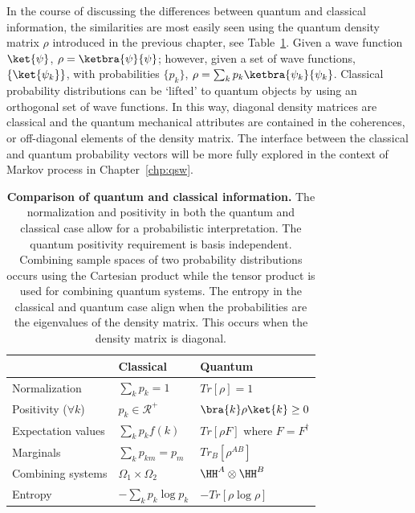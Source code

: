 \documentclass[11pt,oneside,final]{huthesis}%
\begin{document}
In the course of discussing the differences between quantum and classical information, the similarities are most easily seen using the quantum density matrix $\rho$ introduced in the previous chapter, see Table~\ref{tab:qcl}.  Given a wave function $\ket{\psi}$, $\rho=\ketbra{\psi}{\psi}$; however, given a set of wave functions, $\{\ket{\psi_k}\}$, with probabilities $\{p_k\}$, $\rho=\sum_k p_k \ketbra{\psi_k}{\psi_k}$.
Classical probability distributions can be `lifted' to quantum objects by using an orthogonal set of wave functions.  In this way, diagonal density matrices are classical and the quantum mechanical attributes are contained in the coherences, or off-diagonal elements of the density matrix. The interface between the classical and quantum probability vectors will be more fully explored in the context of Markov process in Chapter~\ref{chp:qsw}. %
\begin{table}
	\centering
	\begin{tabular}{lll}
	\hline
	      &Classical       &    Quantum\\[2ex]
	      \hline
Normalization &$\sum_k p_k=1$  & $Tr[\rho]=1$\\[2ex] %
Positivity ($\forall k$) &$p_k\in \mathcal{R}^+$&$\bra{k}\rho\ket{k}\geq 0$\\[2ex]
Expectation values & $\sum_k p_k f(k) $  & $Tr[\rho F]$ where $F=F^\dagger$\\[2ex] %
Marginals & $\sum_k p_{km}=p_m$& $Tr_B[\rho^{AB}]$ \\[2ex]
Combining systems & $\Omega_1\times\Omega_2$& $\HH^A\otimes\HH^B$\\[2ex]
Entropy   & $-\sum_k p_k\log p_k$  &$-Tr[\rho\log\rho]$\\
	\hline
	\end{tabular}
	\caption{\textbf{Comparison of quantum and classical information.} The normalization and positivity in both the quantum and classical case allow for a probabilistic interpretation. The quantum positivity requirement is basis independent.  Combining sample spaces of two probability distributions occurs using the Cartesian product while the tensor product is used for combining quantum systems.  The entropy in the classical and quantum case align when the probabilities are the eigenvalues of the density matrix.  This occurs when the density matrix is diagonal.  }
	\label{tab:qcl}
\end{table}
\end{document}
